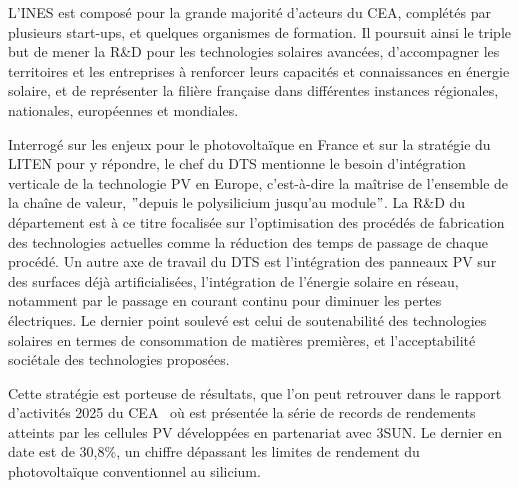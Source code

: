 L'\gls{INES} est composé pour la grande majorité d'acteurs du \gls{CEA}, complétés par plusieurs start-ups, et quelques organismes de formation.
Il poursuit ainsi le triple but de mener la R\&D pour les technologies solaires avancées, d'accompagner les territoires et les entreprises à renforcer leurs capacités et connaissances en énergie solaire, et de représenter la filière française dans différentes instances régionales, nationales, européennes et mondiales\cite{site_ines}.

\begin{bluebox}
    Interrogé sur les enjeux pour le photovoltaïque en France et sur la stratégie du \gls{LITEN} pour y répondre\cite{CEA_prez_LITEN}, le chef du \gls{DTS} mentionne le besoin d'intégration verticale de la technologie PV en Europe, c'est-à-dire la maîtrise de l'ensemble de la chaîne de valeur,  \("\)depuis le polysilicium jusqu'au module\("\).
    La R\&D du département est à ce titre focalisée sur l'optimisation des procédés de fabrication des technologies actuelles comme la réduction des temps de passage de chaque procédé.
    Un autre axe de travail du \gls{DTS} est l'intégration des panneaux PV sur des surfaces déjà artificialisées, l'intégration de l'énergie solaire en réseau, notamment par le passage en courant continu pour diminuer les pertes électriques.
    Le dernier point soulevé est celui de soutenabilité des technologies solaires en termes de consommation de matières premières, et l'acceptabilité sociétale des technologies proposées.

    Cette stratégie est porteuse de résultats, que l'on peut retrouver dans le rapport d'activités 2025 du \gls{CEA}~\cite{CEA_prez_generale} où est présentée la série de records de rendements atteints par les cellules PV développées en partenariat avec 3SUN\@.
    Le dernier en date est de 30,8\%, un chiffre dépassant les limites de rendement du photovoltaïque conventionnel au silicium.
\end{bluebox}

